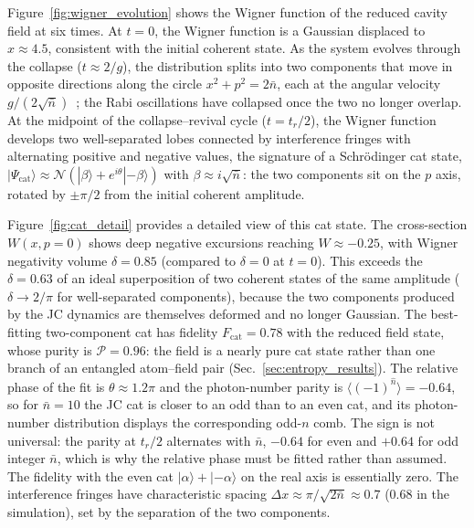 \documentclass{iopjournal}
\begin{document}
Figure~\ref{fig:wigner_evolution} shows the Wigner function of the reduced cavity field at six times. At $t = 0$, the Wigner function is a Gaussian displaced to $x \approx 4.5$, consistent with the initial coherent state. As the system evolves through the collapse ($t \approx 2/g$), the distribution splits into two components that move in opposite directions along the circle $x^2 + p^2 = 2\bar{n}$, each at the angular velocity $g/(2\sqrt{\bar{n}})$~\cite{gea-banacloche1991}; the Rabi oscillations have collapsed once the two no longer overlap. At the midpoint of the collapse--revival cycle ($t = t_r/2$), the Wigner function develops two well-separated lobes connected by interference fringes with alternating positive and negative values, the signature of a Schr\"{o}dinger cat state, $|\Psi_{\text{cat}}\rangle \approx \mathcal{N}(|\beta\rangle + e^{i\theta}|{-\beta}\rangle)$ with $\beta \approx i\sqrt{\bar{n}}$: the two components sit on the $p$ axis, rotated by $\pm\pi/2$ from the initial coherent amplitude.

Figure~\ref{fig:cat_detail} provides a detailed view of this cat state. The cross-section $W(x, p = 0)$ shows deep negative excursions reaching $W \approx -0.25$, with Wigner negativity volume $\delta = 0.85$ (compared to $\delta = 0$ at $t = 0$). This exceeds the $\delta = 0.63$ of an ideal superposition of two coherent states of the same amplitude ($\delta \to 2/\pi$ for well-separated components), because the two components produced by the JC dynamics are themselves deformed and no longer Gaussian. The best-fitting two-component cat has fidelity $F_{\text{cat}} = 0.78$ with the reduced field state, whose purity is $\mathcal{P} = 0.96$: the field is a nearly pure cat state rather than one branch of an entangled atom--field pair (Sec.~\ref{sec:entropy_results}). The relative phase of the fit is $\theta \approx 1.2\pi$ and the photon-number parity is $\langle(-1)^{\hat{n}}\rangle = -0.64$, so for $\bar{n} = 10$ the JC cat is closer to an odd than to an even cat, and its photon-number distribution displays the corresponding odd-$n$ comb. The sign is not universal: the parity at $t_r/2$ alternates with $\bar{n}$, $-0.64$ for even and $+0.64$ for odd integer $\bar{n}$, which is why the relative phase must be fitted rather than assumed. The fidelity with the even cat $|\alpha\rangle + |{-\alpha}\rangle$ on the real axis is essentially zero. The interference fringes have characteristic spacing $\Delta x \approx \pi/\sqrt{2\bar{n}} \approx 0.7$ (0.68 in the simulation), set by the separation of the two components.
\end{document}
